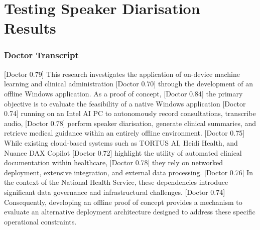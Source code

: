 \chapter{Testing Speaker Diarisation Results}
\label{app:speaker_diarisation_results}
\subsection{Doctor Transcript}
\noindent
{[Doctor 0.79]} This research investigates the application of on-device machine learning and clinical administration \newline
{[Doctor 0.70]} through the development of an offline Windows application. As a proof of concept, \newline
{[Doctor 0.84]} the primary objective is to evaluate the feasibility of a native Windows application \newline
{[Doctor 0.74]} running on an Intel AI PC to autonomously record consultations, transcribe audio, \newline
{[Doctor 0.78]} perform speaker diarisation, generate clinical summaries, and retrieve medical guidance within an entirely offline environment. \newline
{[Doctor 0.75]} While existing cloud-based systems such as TORTUS AI, Heidi Health, and Nuance DAX Copilot \newline
{[Doctor 0.72]} highlight the utility of automated clinical documentation within healthcare, \newline
{[Doctor 0.78]} they rely on networked deployment, extensive integration, and external data processing. \newline
{[Doctor 0.76]} In the context of the National Health Service, these dependencies introduce significant data governance and infrastructural challenges. \newline
{[Doctor 0.74]} Consequently, developing an offline proof of concept provides a mechanism to evaluate an alternative deployment architecture designed to address these specific operational constraints.

\vspace{1em}

